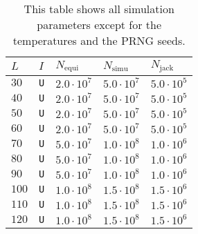 \begin{table}[!h]
  \centering
  \begin{tabular}{|lllll|}
    \hline
    $L$  & $I$ & $N_\mathrm{equi}$ & $N_\mathrm{simu}$ & $N_\mathrm{jack}$ \\ 
    \hline
    $30$ & \verb|U| & $2.0\cdot10^{7}$ & $5.0\cdot10^{7}$ & $5.0\cdot10^{5}$\\
    $40$ & \verb|U| & $2.0\cdot10^{7}$ & $5.0\cdot10^{7}$ & $5.0\cdot10^{5}$\\
    $50$ & \verb|U| & $2.0\cdot10^{7}$ & $5.0\cdot10^{7}$ & $5.0\cdot10^{5}$\\
    $60$ & \verb|U| & $2.0\cdot10^{7}$ & $5.0\cdot10^{7}$ & $5.0\cdot10^{5}$\\
    $70$ & \verb|U| & $5.0\cdot10^{7}$ & $1.0\cdot10^{8}$ & $1.0\cdot10^{6}$\\
    $80$ & \verb|U| & $5.0\cdot10^{7}$ & $1.0\cdot10^{8}$ & $1.0\cdot10^{6}$\\
    $90$ & \verb|U| & $5.0\cdot10^{7}$ & $1.0\cdot10^{8}$ & $1.0\cdot10^{6}$\\
    $100$ & \verb|U| & $1.0\cdot10^{8}$ & $1.5\cdot10^{8}$ & $1.5\cdot10^{6}$\\
    $110$ & \verb|U| & $1.0\cdot10^{8}$ & $1.5\cdot10^{8}$ & $1.5\cdot10^{6}$\\
    $120$ & \verb|U| & $1.0\cdot10^{8}$ & $1.5\cdot10^{8}$ & $1.5\cdot10^{6}$\\
    \hline
  \end{tabular}
  \caption{This table shows all simulation parameters except for the temperatures and the PRNG seeds.}
  \label{table:experiment_kalz1}
\end{table}

